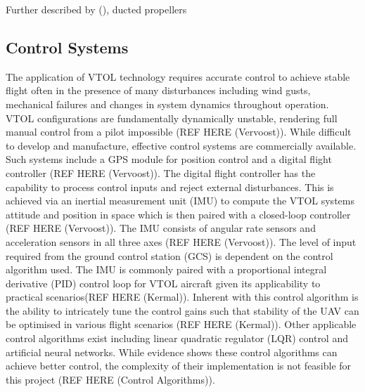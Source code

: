 Further described by \citeauthor{yilmaz2015performance} (\citeyear{yilmaz2015performance}), ducted propellers                      
 

\subsection{Control Systems}
The application of VTOL technology requires accurate control to achieve stable flight often in the  presence of many disturbances including wind gusts, mechanical failures and changes in system dynamics throughout operation. VTOL configurations are fundamentally dynamically unstable, rendering full manual control from a pilot impossible (REF HERE (Vervoost)). While difficult to develop and manufacture, effective control systems are commercially available. Such systems include a GPS module for position control and a digital flight controller (REF HERE (Vervoost)). The digital flight controller has the capability to process control inputs and reject external disturbances. This is achieved via an inertial measurement unit (IMU) to compute the VTOL systems attitude and position in space which is then paired with a closed-loop controller (REF HERE (Vervoost)). The IMU consists of angular rate sensors and acceleration sensors in all three axes (REF HERE (Vervoost)). The level of input required from the ground control station (GCS) is dependent on the control algorithm used. The IMU is commonly paired with a proportional integral derivative (PID) control loop for VTOL aircraft given its applicability to practical scenarios(REF HERE (Kermal)). Inherent with this control algorithm is the ability to intricately tune the control gains such that stability of the UAV can be optimised in various flight scenarios (REF HERE (Kermal)). Other applicable control algorithms exist including linear quadratic regulator (LQR) control and artificial neural networks. While evidence shows these control algorithms can achieve better control, the complexity of their implementation is not feasible for this project (REF HERE (Control Algorithms)). 

